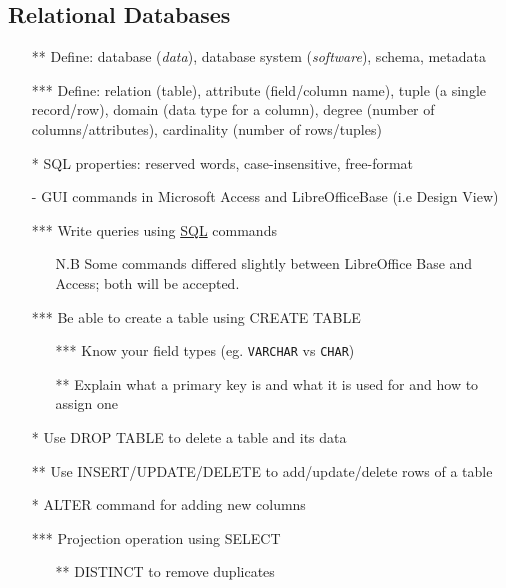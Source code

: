 \documentclass[12pt]{article}%
\begin{document}
\subsection*{Relational Databases}
\begin{itemize}
 \setlength{\itemsep}{1pt}%
    \setlength{\parskip}{1pt}
\item[**] Define: database ({\it data}), database system ({\it software}), schema, metadata
\item[***] Define: relation (table), attribute (field/column name), tuple (a single record/row), domain (data type for a column), degree (number of columns/attributes), cardinality (number of rows/tuples)
\item[*] SQL properties: reserved words, case-insensitive, free-format
\item[-] GUI commands in Microsoft Access and LibreOfficeBase (i.e Design View)
\item[***] Write queries using \underline{SQL} commands%
\begin{itemize}
\item[N.B] Some commands differed slightly between LibreOffice Base and Access; both will be accepted.
\end{itemize}
\item[***] Be able to create a table using CREATE TABLE 
\begin{itemize}
\item[***] Know your field types (eg. \verb|VARCHAR| vs \verb|CHAR|)
\item[**] Explain what a primary key is and what it is used for and how to assign one
\end{itemize}
\item[*] Use DROP TABLE to delete a table and its data
 \item[**] Use INSERT/UPDATE/DELETE to add/update/delete rows of a table %
\item[*] ALTER command for adding new columns
\item[***] Projection operation using SELECT
\begin{itemize}
\item[**] DISTINCT to remove duplicates
\end{itemize}

\end{itemize}
\end{document}

